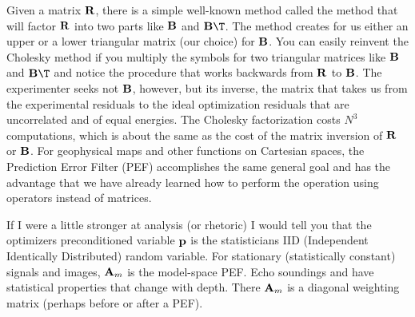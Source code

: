 \par
Given a matrix $\bold R$,
there is a simple well-known method
called the  method that will factor $\bold R$
into two parts like $\bold B$ and $\bold B\T$.
The method creates for us either an upper or a lower triangular
matrix (our choice) for $\bold B$.
You can easily reinvent the Cholesky method
if you multiply
the symbols for two triangular matrices like
$\bold B$ and $\bold B\T$ and notice the procedure that
works backwards from $\bold R$ to $\bold B$.
The experimenter seeks not $\bold B$, however, but its inverse,
the matrix that takes us from the experimental residuals
to the ideal optimization residuals
that are uncorrelated and of equal energies.
The Cholesky factorization costs $N^3$ computations,
which is about the same as the cost of the matrix inversion
of $\bold R$ or $\bold B$.
For geophysical maps and other functions on Cartesian spaces,
the Prediction Error Filter (PEF) accomplishes the same
general goal and has the advantage that we have already
learned how to perform the operation using operators
instead of matrices.
\par
{}
%
\par
If I were a little stronger at analysis (or rhetoric)
I would tell you that
the optimizers preconditioned variable $\bold p$
is the statisticians IID (Independent Identically Distributed) random variable.
For stationary (statistically constant) signals and images,
$\bold A_m$
is the model-space PEF.
Echo soundings and
have statistical properties
that change with depth.
There $\bold A_m$
is a diagonal weighting matrix
(perhaps before or after a PEF).



